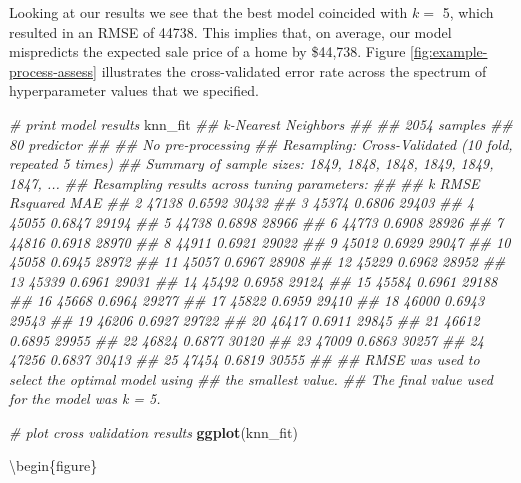 \documentclass[]{krantz}
\makeatletter
\newenvironment{Shaded}{\begin{snugshade}}{\end{snugshade}}
\newcommand{\CommentTok}[1]{\textcolor[rgb]{0.37,0.37,0.37}{\textit{#1}}}
\newcommand{\KeywordTok}[1]{\textcolor[rgb]{0.27,0.27,0.27}{\textbf{#1}}}
\newcommand{\NormalTok}[1]{#1}
\newenvironment{kframe}{%
\medskip{}
\setlength{\fboxsep}{.8em}
 \def\at@end@of@kframe{}%
 \ifinner\ifhmode%
  \def\at@end@of@kframe{\end{minipage}}%
  \begin{minipage}{\columnwidth}%
 \fi\fi%
 \def\FrameCommand##1{\hskip\@totalleftmargin \hskip-\fboxsep
 \colorbox{shadecolor}{##1}\hskip-\fboxsep
     \hskip-\linewidth \hskip-\@totalleftmargin \hskip\columnwidth}%
 \MakeFramed {\advance\hsize-\width
   \@totalleftmargin\z@ \linewidth\hsize
   \@setminipage}}%
 {\par\unskip\endMakeFramed%
 \at@end@of@kframe}
\renewenvironment{Shaded}{\begin{kframe}}{\end{kframe}}
\makeatother
\begin{document}
Looking at our results we see that the best model coincided with \(k=\) 5, which resulted in an RMSE of 44738. This implies that, on average, our model mispredicts the expected sale price of a home by \$44,738. Figure \ref{fig:example-process-assess} illustrates the cross-validated error rate across the spectrum of hyperparameter values that we specified.

\begin{Shaded}
\begin{Highlighting}[]
\CommentTok{# print model results}
\NormalTok{knn_fit}
\CommentTok{## k-Nearest Neighbors }
\CommentTok{## }
\CommentTok{## 2054 samples}
\CommentTok{##   80 predictor}
\CommentTok{## }
\CommentTok{## No pre-processing}
\CommentTok{## Resampling: Cross-Validated (10 fold, repeated 5 times) }
\CommentTok{## Summary of sample sizes: 1849, 1848, 1848, 1849, 1849, 1847, ... }
\CommentTok{## Resampling results across tuning parameters:}
\CommentTok{## }
\CommentTok{##   k   RMSE   Rsquared  MAE  }
\CommentTok{##    2  47138  0.6592    30432}
\CommentTok{##    3  45374  0.6806    29403}
\CommentTok{##    4  45055  0.6847    29194}
\CommentTok{##    5  44738  0.6898    28966}
\CommentTok{##    6  44773  0.6908    28926}
\CommentTok{##    7  44816  0.6918    28970}
\CommentTok{##    8  44911  0.6921    29022}
\CommentTok{##    9  45012  0.6929    29047}
\CommentTok{##   10  45058  0.6945    28972}
\CommentTok{##   11  45057  0.6967    28908}
\CommentTok{##   12  45229  0.6962    28952}
\CommentTok{##   13  45339  0.6961    29031}
\CommentTok{##   14  45492  0.6958    29124}
\CommentTok{##   15  45584  0.6961    29188}
\CommentTok{##   16  45668  0.6964    29277}
\CommentTok{##   17  45822  0.6959    29410}
\CommentTok{##   18  46000  0.6943    29543}
\CommentTok{##   19  46206  0.6927    29722}
\CommentTok{##   20  46417  0.6911    29845}
\CommentTok{##   21  46612  0.6895    29955}
\CommentTok{##   22  46824  0.6877    30120}
\CommentTok{##   23  47009  0.6863    30257}
\CommentTok{##   24  47256  0.6837    30413}
\CommentTok{##   25  47454  0.6819    30555}
\CommentTok{## }
\CommentTok{## RMSE was used to select the optimal model using}
\CommentTok{##  the smallest value.}
\CommentTok{## The final value used for the model was k = 5.}

\CommentTok{# plot cross validation results}
\KeywordTok{ggplot}\NormalTok{(knn_fit)}
\end{Highlighting}
\end{Shaded}

\textbackslash{}begin\{figure\}
\end{document}
